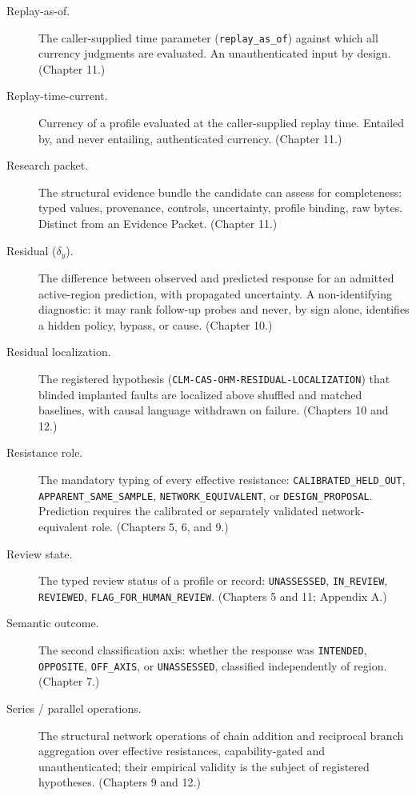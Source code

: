 \begin{description}
\item[Replay-as-of.] The caller-supplied time parameter (\texttt{replay\_as\_of}) against which all currency judgments are evaluated. An unauthenticated input by design. (Chapter 11.)

\item[Replay-time-current.] Currency of a profile evaluated at the caller-supplied replay time. Entailed by, and never entailing, authenticated currency. (Chapter 11.)

\item[Research packet.] The structural evidence bundle the candidate can assess for completeness: typed values, provenance, controls, uncertainty, profile binding, raw bytes. Distinct from an Evidence Packet. (Chapter 11.)

\item[Residual ($\delta_y$).] The difference between observed and predicted response for an admitted active-region prediction, with propagated uncertainty. A non-identifying diagnostic: it may rank follow-up probes and never, by sign alone, identifies a hidden policy, bypass, or cause. (Chapter 10.)

\item[Residual localization.] The registered hypothesis (\texttt{CLM-CAS-OHM-RESIDUAL-LOCALIZATION}) that blinded implanted faults are localized above shuffled and matched baselines, with causal language withdrawn on failure. (Chapters 10 and 12.)

\item[Resistance role.] The mandatory typing of every effective resistance: \texttt{CALIBRATED\_HELD\_OUT}, \texttt{APPARENT\_SAME\_SAMPLE}, \texttt{NETWORK\_EQUIVALENT}, or \texttt{DESIGN\_PROPOSAL}. Prediction requires the calibrated or separately validated network-equivalent role. (Chapters 5, 6, and 9.)

\item[Review state.] The typed review status of a profile or record: \texttt{UNASSESSED}, \texttt{IN\_REVIEW}, \texttt{REVIEWED}, \texttt{FLAG\_FOR\_HUMAN\_REVIEW}. (Chapters 5 and 11; Appendix A.)

\item[Semantic outcome.] The second classification axis: whether the response was \texttt{INTENDED}, \texttt{OPPOSITE}, \texttt{OFF\_AXIS}, or \texttt{UNASSESSED}, classified independently of region. (Chapter 7.)

\item[Series / parallel operations.] The structural network operations of chain addition and reciprocal branch aggregation over effective resistances, capability-gated and unauthenticated; their empirical validity is the subject of registered hypotheses. (Chapters 9 and 12.)


\end{description}
